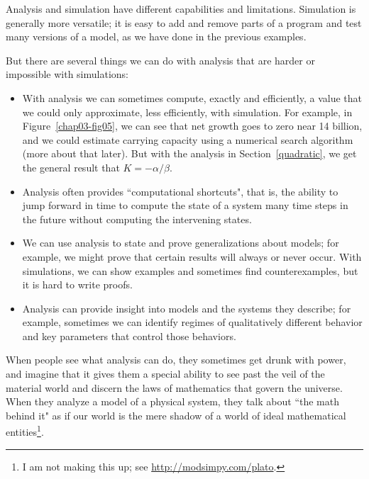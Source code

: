 \documentclass[12pt]{book}
\theoremstyle{exercise}
\begin{document}

Analysis and simulation have different capabilities and limitations.  Simulation is generally more versatile; it is easy to add and remove parts of a program and test many versions of a model, as we have done in the previous examples.

But there are several things we can do with analysis that are harder or impossible with simulations:

\begin{itemize}

\item With analysis we can sometimes compute, exactly and efficiently, a value that we could only approximate, less efficiently, with simulation.  For example, in Figure~\ref{chap03-fig05}, we can see that net growth goes to zero near 14 billion, and we could estimate carrying capacity using a numerical search algorithm (more about that later).  But with the analysis in Section~\ref{quadratic}, we get the general result that $K=-\alpha/\beta$.

\item Analysis often provides ``computational shortcuts", that is, the ability to jump forward in time to compute the state of a system many time steps in the future without computing the intervening states.


\item We can use analysis to state and prove generalizations about models; for example, we might prove that certain results will always or never occur.  With simulations, we can show examples and sometimes find counterexamples, but it is hard to write proofs.


\item Analysis can provide insight into models and the systems they describe; for example, sometimes we can identify regimes of qualitatively different behavior and key parameters that control those behaviors.


\end{itemize}

When people see what analysis can do, they sometimes get drunk with power, and imagine that it gives them a special ability to see past the veil of the material world and discern the laws of mathematics that govern the universe.  When they analyze a model of a physical system, they talk about ``the math behind it" as if our world is the mere shadow of a world of ideal mathematical entities\footnote{I am not making this up; see \url{http://modsimpy.com/plato}.}.
\end{document}
